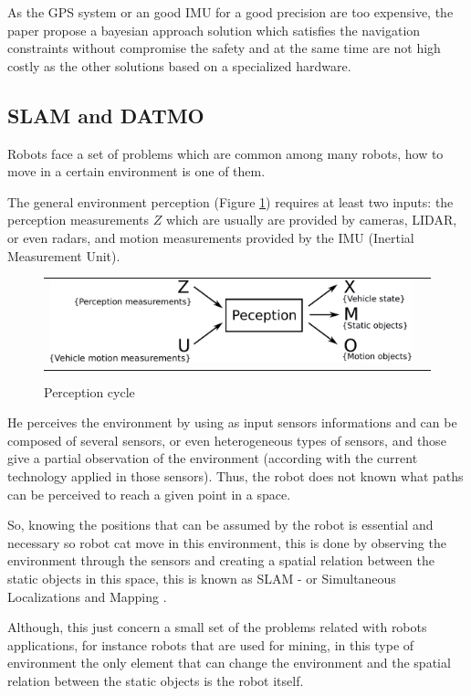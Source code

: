 As the GPS system or an good IMU for a good precision are too expensive, the paper propose a bayesian approach solution which satisfies the navigation constraints without compromise the safety and at the same time are not high costly as the other solutions based on a specialized hardware.

\subsection{SLAM and DATMO}

Robots face a set of problems which are common among many robots, how to move in a certain environment is one of them.

The general environment perception (Figure \ref{fig:perception:cycle}) requires at least two inputs: the perception measurements $Z$ which are usually are provided by cameras, LIDAR, or even radars, and motion measurements provided by the IMU (Inertial Measurement Unit).

\begin{figure}[h]
   \centering
     \begin{tabular}{lr}
       \includegraphics[scale=0.5]{img/fig:perception:cycle}
     \end{tabular}
   \caption{Perception cycle}
   \label{fig:perception:cycle}
 \end{figure}


He perceives the environment by using as input sensors informations and can be composed of several sensors, or even heterogeneous types of sensors, and those give a partial observation of the environment (according with the current technology applied in those sensors). Thus, the robot does not known what paths can be perceived to reach a given point in a space.

So, knowing the positions that can be assumed by the robot is essential and necessary so robot cat move in this environment, this is done by observing the environment through the sensors and creating a spatial relation between the static objects in this space, this is known as SLAM - or Simultaneous Localizations and Mapping \cite{iyengar1991autonomous}.

Although, this just concern a small set of the problems related with robots applications, for instance robots that are used for mining, in this type of environment the only element that can change the environment and the spatial relation between the static objects is the robot itself. 

